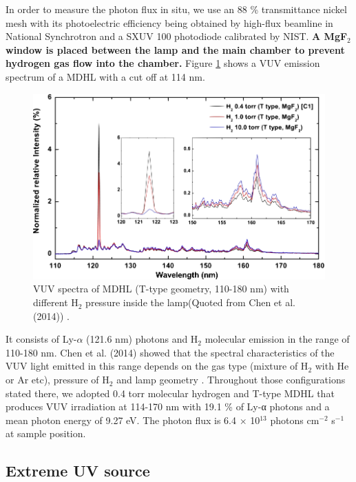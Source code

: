 In order to measure the photon flux in situ, we use an 88 \% transmittance nickel mesh with its photoelectric efficiency being obtained by high-flux beamline in National Synchrotron and a SXUV 100 photodiode calibrated by NIST. \textbf{A MgF$_2$ window is placed between the lamp and the main chamber to prevent hydrogen gas flow into the chamber.} Figure \ref{fig:MDHL} shows a VUV emission spectrum of a MDHL with a cut off at 114 nm.
\begin{figure}
\centering
\includegraphics[width=\textwidth]{figures/chapter2/MDHL.png}
\caption{VUV spectra of MDHL (T-type geometry, 110-180 nm) with different H$_2$ pressure inside the lamp(Quoted from Chen et al. (2014)\cite{chen2013vacuum}) .}
\label{fig:MDHL}
\end{figure}
It consists of Ly-$\alpha$ (121.6 nm) photons and H$_2$ molecular emission in the range of 110-180 nm. Chen et al. (2014)\cite{chen2013vacuum} showed that the spectral characteristics of the VUV light emitted in this range depends on the gas type (mixture of H$_2$ with He or Ar etc), pressure of H$_2$ and lamp geometry \cite{chen2013vacuum}. Throughout those configurations stated there, we adopted 0.4 torr molecular hydrogen and T-type MDHL that produces VUV irradiation at 114-170 nm with 19.1 \% of Ly-α photons and a mean photon energy of 9.27 eV. The photon flux is 6.4 $\times$ 10$^{13}$ photons cm$^{-2}$ s$^{-1}$ at sample position.

\subsection{\textbf{Extreme UV} source}
\label{sec:Extreme_EUV_source}

